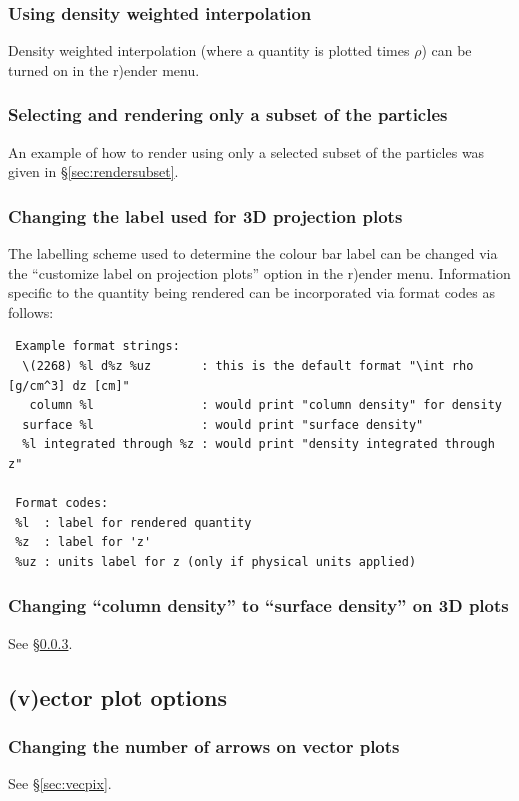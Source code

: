 \documentclass[a4paper,10pt]{article}
\begin{document}
\subsubsection{ Using density weighted interpolation}
 Density weighted interpolation (where a quantity is plotted times $\rho$) can be turned on in the r)ender menu.

\subsubsection{ Selecting and rendering only a subset of the particles}
 An example of how to render using only a selected subset of the particles was given in \S\ref{sec:rendersubset}.

\subsubsection{ Changing the label used for 3D projection plots}
\label{sec:setprojlabel}
The labelling scheme used to determine the colour bar label can be changed via the ``customize label on projection plots'' option in the r)ender menu. Information specific to the quantity being rendered can be incorporated via format codes as follows:
\begin{verbatim}
 Example format strings: 
  \(2268) %l d%z %uz       : this is the default format "\int rho [g/cm^3] dz [cm]"
   column %l               : would print "column density" for density
  surface %l               : would print "surface density"
  %l integrated through %z : would print "density integrated through z"

 Format codes: 
 %l  : label for rendered quantity 
 %z  : label for 'z' 
 %uz : units label for z (only if physical units applied)
\end{verbatim}


\subsubsection{ Changing ``column density'' to ``surface density'' on 3D plots}
See \S\ref{sec:setprojlabel}.

\subsection{(v)ector plot options}
\label{sec:vectorplots}

\subsubsection{ Changing the number of arrows on vector plots}
 See \S\ref{sec:vecpix}.
\end{document}
